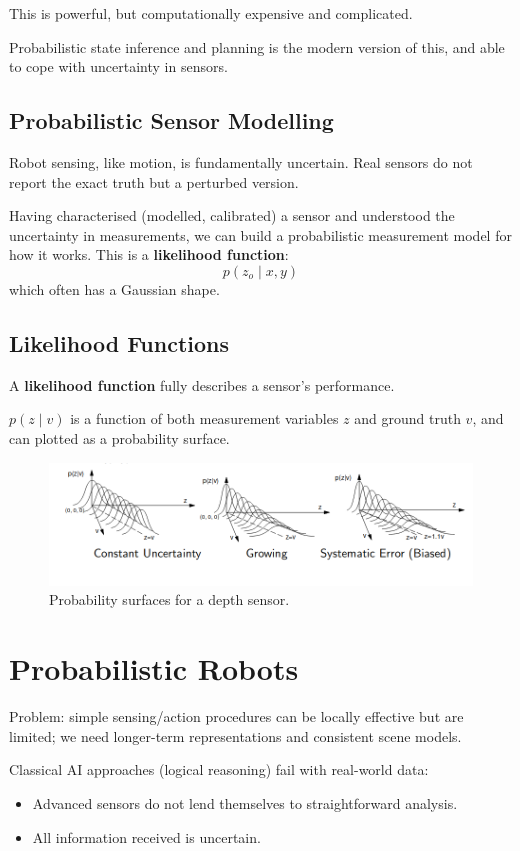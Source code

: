\documentclass[11pt]{article}
\begin{document}
This is powerful, but computationally expensive and complicated.

Probabilistic state inference and planning is the modern version of this, and able to cope with uncertainty in sensors.

\subsection{Probabilistic Sensor Modelling}
Robot sensing, like motion, is fundamentally uncertain.
Real sensors do not report the exact truth but a perturbed version.

Having characterised (modelled, calibrated) a sensor and understood the uncertainty in measurements, we can build a probabilistic measurement model for how it works.
This is a \textbf{likelihood function}:
\[
  p(z_o \mid x, y)
\]
which often has a Gaussian shape.

\subsection{Likelihood Functions}
A \textbf{likelihood function} fully describes a sensor's performance.

$p(z \mid v)$ is a function of both measurement variables $z$ and ground truth $v$, and can plotted as a probability surface.

\begin{figure}[h]
  \caption{Probability surfaces for a depth sensor.}
  \includegraphics[scale=0.4]{uncertainty}
  \centering
\end{figure}

\section{Probabilistic Robots}
Problem: simple sensing/action procedures can be locally effective but are limited; we need longer-term representations and consistent scene models.

Classical AI approaches (logical reasoning) fail with real-world data:
\begin{itemize}
  \item Advanced sensors do not lend themselves to straightforward analysis.
  \item All information received is uncertain.
\end{itemize}
\end{document}
